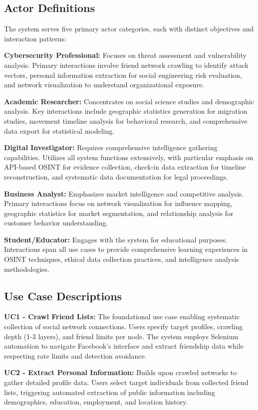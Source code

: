 \documentclass[13pt,a4paper]{report}
\begin{document}
\subsection{Actor Definitions}
The system serves five primary actor categories, each with distinct objectives and interaction patterns:

\textbf{Cybersecurity Professional:} Focuses on threat assessment and vulnerability analysis. Primary interactions involve friend network crawling to identify attack vectors, personal information extraction for social engineering risk evaluation, and network visualization to understand organizational exposure.

\textbf{Academic Researcher:} Concentrates on social science studies and demographic analysis. Key interactions include geographic statistics generation for migration studies, movement timeline analysis for behavioral research, and comprehensive data export for statistical modeling.

\textbf{Digital Investigator:} Requires comprehensive intelligence gathering capabilities. Utilizes all system functions extensively, with particular emphasis on API-based OSINT for evidence collection, check-in data extraction for timeline reconstruction, and systematic data documentation for legal proceedings.

\textbf{Business Analyst:} Emphasizes market intelligence and competitive analysis. Primary interactions focus on network visualization for influence mapping, geographic statistics for market segmentation, and relationship analysis for customer behavior understanding.

\textbf{Student/Educator:} Engages with the system for educational purposes. Interactions span all use cases to provide comprehensive learning experiences in OSINT techniques, ethical data collection practices, and intelligence analysis methodologies.

\subsection{Use Case Descriptions}
\textbf{UC1 - Crawl Friend Lists:} The foundational use case enabling systematic collection of social network connections. Users specify target profiles, crawling depth (1-3 layers), and friend limits per node. The system employs Selenium automation to navigate Facebook's interface and extract friendship data while respecting rate limits and detection avoidance.

\textbf{UC2 - Extract Personal Information:} Builds upon crawled networks to gather detailed profile data. Users select target individuals from collected friend lists, triggering automated extraction of public information including demographics, education, employment, and location history.
\end{document}
